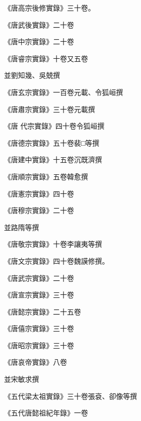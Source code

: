 \begin{pinyinscope}
 《唐高宗後修實錄》三十卷。



 《唐武後實錄》二十卷



 《唐中宗實錄》二十卷



 《唐睿宗實錄》十卷又五卷



 並劉知幾、吳兢撰



 《唐玄宗實錄》一百卷元載、令狐峘撰



 《唐肅宗實錄》三十卷元載撰



 《唐
 代宗實錄》四十卷令狐峘撰



 《唐德宗實錄》五十卷裴□等撰



 《唐建中實錄》十五卷沉既濟撰



 《唐順宗實錄》五卷韓愈撰



 《唐憲宗實錄》四十卷



 《唐穆宗實錄》二十卷



 並路隋等撰



 《唐敬宗實錄》十卷李讓夷等撰



 《唐文宗實錄》四十卷魏謨修撰。



 《唐武宗實錄》二十卷



 《唐宣宗實錄》三十卷



 《唐懿宗實錄》二十五卷



 《唐僖宗實錄》三十卷



 《唐昭宗實錄》三十卷



 《唐哀帝實錄》八卷



 並宋敏求撰



 《五代梁太祖實錄》三十卷張袞、卻像等撰



 《五代唐懿祖紀年錄》一卷




\end{pinyinscope}
